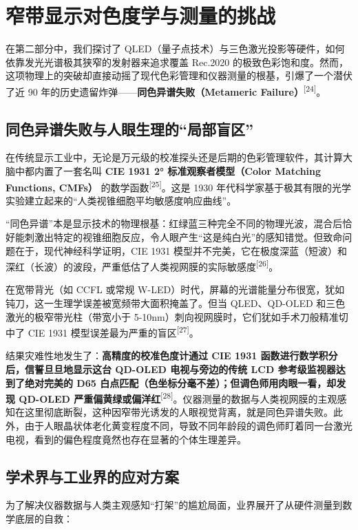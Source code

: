 \documentclass[12pt, a4paper]{ctexart}
\newcommand{\scite}[1]{\textsuperscript{[#1]}}
\begin{document}
\newpage
\section{窄带显示对色度学与测量的挑战}

在第二部分中，我们探讨了 QLED（量子点技术）与三色激光投影等硬件，如何依靠发光光谱极其狭窄的发射器来追求覆盖 Rec.2020 的极致色彩饱和度。然而，这项物理上的突破却直接动摇了现代色彩管理和仪器测量的根基，引爆了一个潜伏了近 90 年的历史遗留炸弹——\textbf{同色异谱失败（Metameric Failure）}\scite{24}。

\subsection{同色异谱失败与人眼生理的“局部盲区”}

在传统显示工业中，无论是万元级的校准探头还是后期的色彩管理软件，其计算大脑中都内置了一套名叫 \textbf{CIE 1931 2° 标准观察者模型（Color Matching Functions, CMFs）} 的数学函数\scite{25}。这是 1930 年代科学家基于极其有限的光学实验建立起来的“人类视锥细胞平均敏感度响应曲线”。

“同色异谱”本是显示技术的物理根基：红绿蓝三种完全不同的物理光波，混合后恰好能刺激出特定的视锥细胞反应，令人眼产生“这是纯白光”的感知错觉。但致命问题在于，现代神经科学证明，CIE 1931 模型并不完美，它在极度深蓝（短波）和深红（长波）的波段，严重低估了人类视网膜的实际敏感度\scite{26}。

在宽带背光（如 CCFL 或常规 W-LED）时代，屏幕的光谱能量分布很宽，犹如钝刀，这一生理学误差被宽频带大面积掩盖了。但当 QLED、QD-OLED 和三色激光的极窄带光柱（带宽小于 5-10nm）刺向视网膜时，它们犹如手术刀般精准切中了 CIE 1931 模型误差最为严重的盲区\scite{27}。

结果灾难性地发生了：\textbf{高精度的校准色度计通过 CIE 1931 函数进行数学积分后，信誓旦旦地显示这台 QD-OLED 电视与旁边的传统 LCD 参考级监视器达到了绝对完美的 D65 白点匹配（色坐标分毫不差）；但调色师用肉眼一看，却发现 QD-OLED 严重偏黄绿或偏洋红}\scite{28}。仪器测量的数据与人类视网膜的主观感知在这里彻底断裂，这种因窄带光诱发的人眼视觉背离，就是同色异谱失败。此外，由于人眼晶状体老化黄变程度不同，导致不同年龄段的调色师盯着同一台激光电视，看到的偏色程度竟然也存在显著的个体生理差异。

\subsection{学术界与工业界的应对方案}

为了解决仪器数据与人类主观感知“打架”的尴尬局面，业界展开了从硬件测量到数学底层的自救：
\end{document}
